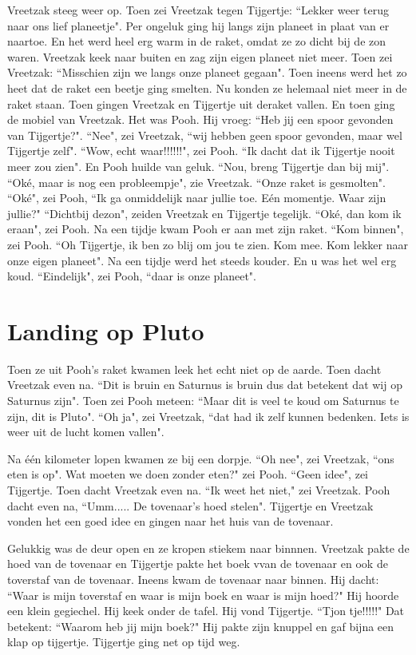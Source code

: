 \documentclass{article}
\begin{document}
Vreetzak steeg weer op. Toen zei Vreetzak tegen Tijgertje: ``Lekker weer terug naar ons lief planeetje". Per ongeluk ging hij langs zijn planeet in plaat van er naartoe. En het werd heel erg warm in de raket, omdat ze zo dicht bij de zon waren. Vreetzak keek naar buiten en zag zijn eigen planeet niet meer. Toen zei Vreetzak: ``Misschien zijn we langs onze planeet gegaan". Toen ineens werd het zo heet dat de raket een beetje ging smelten. Nu konden ze helemaal niet meer in de raket staan. Toen gingen Vreetzak en Tijgertje uit deraket vallen. En toen ging de mobiel van Vreetzak. Het was Pooh. Hij vroeg: ``Heb jij een spoor gevonden van Tijgertje?". ``Nee", zei Vreetzak, ``wij hebben geen spoor gevonden, maar wel Tijgertje zelf". ``Wow, echt waar!!!!!!", zei Pooh. ``Ik dacht dat ik Tijgertje nooit meer zou zien". En Pooh huilde van geluk. ``Nou, breng Tijgertje dan bij mij". ``Oké, maar is nog een probleempje", zie Vreetzak. ``Onze raket is gesmolten". ``Oké", zei Pooh, ``Ik ga onmiddelijk naar jullie toe. Eén momentje. Waar zijn jullie?" ``Dichtbij dezon", zeiden Vreetzak en Tijgertje tegelijk. ``Oké, dan kom ik eraan", zei Pooh. Na een tijdje kwam Pooh er aan met zijn raket. ``Kom binnen", zei Pooh. ``Oh Tijgertje, ik ben zo blij om jou te zien. Kom mee. Kom lekker naar onze eigen planeet". Na een tijdje werd het steeds kouder. En u was het wel erg koud. ``Eindelijk", zei Pooh, ``daar is onze planeet".

\section{Landing op Pluto}

Toen ze uit Pooh's raket kwamen leek het echt niet op de aarde. Toen dacht Vreetzak even na. ``Dit is bruin en Saturnus is bruin dus dat betekent dat wij op Saturnus zijn". Toen zei Pooh meteen: ``Maar dit is veel te koud om Saturnus te zijn, dit is Pluto". ``Oh ja", zei Vreetzak, ``dat had ik zelf kunnen bedenken. Iets is weer uit de lucht komen vallen".

Na één kilometer lopen kwamen ze bij een dorpje. ``Oh nee", zei Vreetzak, ``ons eten is op". Wat moeten we doen zonder eten?" zei Pooh. ``Geen idee", zei Tijgertje. Toen dacht Vreetzak even na. ``Ik weet het niet," zei Vreetzak. Pooh dacht even na, ``Umm..... De tovenaar's hoed stelen". Tijgertje en Vreetzak vonden het een goed idee en gingen naar het huis van de tovenaar.

Gelukkig was de deur open en ze kropen stiekem naar binnnen. Vreetzak pakte de hoed van de tovenaar en Tijgertje pakte het boek vvan de tovenaar en ook de toverstaf van de tovenaar. Ineens kwam de tovenaar naar binnen. Hij dacht: ``Waar is mijn toverstaf en waar is mijn boek en waar is mijn hoed?" Hij hoorde een klein gegiechel. Hij keek onder de tafel. Hij vond Tijgertje. ``Tjon tje!!!!!" Dat betekent: ``Waarom heb jij mijn boek?" Hij pakte zijn knuppel en gaf bijna een klap op tijgertje. Tijgertje ging net op tijd weg.
\end{document}

